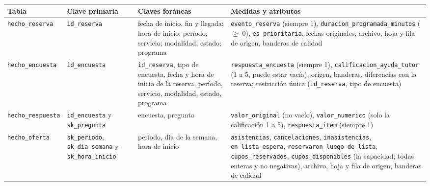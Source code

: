 \documentclass[11pt,letterpaper]{article}
\begin{document}
\begingroup\small\setlength{\tabcolsep}{4pt}\renewcommand{\arraystretch}{1.15}
\begin{longtable}{>{\raggedright\arraybackslash}p{}>{\raggedright\arraybackslash}p{}>{\raggedright\arraybackslash}p{}>{\raggedright\arraybackslash}p{}}
\toprule
\textbf{Tabla} & \textbf{Clave primaria} & \textbf{Claves foráneas} & \textbf{Medidas y atributos} \\
\midrule
\endhead
\texttt{hecho\_\allowbreak{}reserva} & \texttt{id\_\allowbreak{}reserva} & fecha de inicio, fin y llegada; hora de inicio; período; servicio; modalidad; estado; programa & \texttt{evento\_\allowbreak{}reserva} (siempre 1), \texttt{duracion\_\allowbreak{}programada\_\allowbreak{}minutos} ($\geq$ 0), \texttt{es\_\allowbreak{}prioritaria}, fechas originales, archivo, hoja y fila de origen, banderas de calidad \\
\texttt{hecho\_\allowbreak{}encuesta} & \texttt{id\_\allowbreak{}encuesta} & \texttt{id\_\allowbreak{}reserva}, tipo de encuesta, fecha y hora de inicio de la reserva, período, servicio, modalidad, estado, programa & \texttt{respuesta\_\allowbreak{}encuesta} (siempre 1), \texttt{calificacion\_\allowbreak{}ayuda\_\allowbreak{}tutor} (1 a 5, puede estar vacía), origen, banderas, diferencias con la reserva; restricción única (\texttt{id\_\allowbreak{}reserva}, tipo de encuesta) \\
\texttt{hecho\_\allowbreak{}respuesta} & \texttt{id\_\allowbreak{}encuesta} y \texttt{sk\_\allowbreak{}pregunta} & encuesta, pregunta & \texttt{valor\_\allowbreak{}original} (no vacío), \texttt{valor\_\allowbreak{}numerico} (solo la calificación 1 a 5), \texttt{respuesta\_\allowbreak{}item} (siempre 1) \\
\texttt{hecho\_\allowbreak{}oferta} & \texttt{sk\_\allowbreak{}periodo}, \texttt{sk\_\allowbreak{}dia\_\allowbreak{}semana} y \texttt{sk\_\allowbreak{}hora\_\allowbreak{}inicio} & período, día de la semana, hora de inicio & \texttt{asistencias}, \texttt{cancelaciones}, \texttt{inasistencias}, \texttt{en\_\allowbreak{}lista\_\allowbreak{}espera}, \texttt{reservaron\_\allowbreak{}luego\_\allowbreak{}de\_\allowbreak{}lista}, \texttt{cupos\_\allowbreak{}reservados}, \texttt{cupos\_\allowbreak{}disponibles} (la capacidad; todas enteras y no negativas), archivo, hoja y fila de origen, banderas de calidad \\
\bottomrule
\end{longtable}
\endgroup
\end{document}
